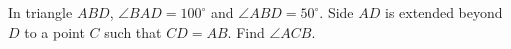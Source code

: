 In triangle $ABD$, $\angle BAD=100^\circ$ and $\angle ABD=50^\circ$. Side $AD$ is extended beyond $D$ to a point $C$ such that $CD=AB$. Find $\angle ACB$.
